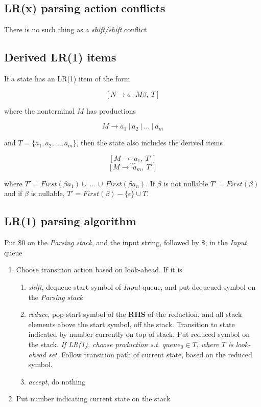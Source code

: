 \documentclass[fontsize=10pt,a4paper]{article}
\begin{document}
\begin{multicols}{3}
    \subsection{LR(x) parsing action conflicts}

    There is no such thing as a \textit{shift/shift} conflict


    \subsection{Derived LR(1) items}

    If a state has an LR(1) item of the form

    \[[N \rightarrow a \cdot M \beta, ~T]\]

    where the nonterminal $M$ has productions

    \[M \rightarrow a_1 ~\vert~ a_2 ~\vert~ \dots ~\vert~ a_m\]

    and $T = \{ a_1, a_2, \dots, a_m \}$, then the state also includes the derived items

    \[[M \rightarrow \cdot a_1, ~T']\]
    \[\dots\]
    \[[M \rightarrow \cdot a_m, ~T']\]

    where $T' = First(\beta a_1) \cup\, \dots\, \cup\, First(\beta a_n)$. If $\beta$ is not nullable $T' = First(\beta)$ and if $\beta$ is nullable, $T' = First(\beta) - \{\epsilon\} \cup T$. 



    \subsection{LR(1) parsing algorithm}

    Put $\$0$ on the \textit{Parsing stack}, and the input string, followed by $\$$, in the \textit{Input} queue

    \begin{enumerate}
        \item Choose transition action based on look-ahead. If it is
        \begin{enumerate}
            \item \textit{shift}, dequeue start symbol of \textit{Input} queue, and put dequeued symbol on the \textit{Parsing stack}
            \item \textit{reduce}, pop start symbol of the \textbf{RHS} of the reduction, and all stack elements above the start symbol, off the stack. Transition to state indicated by number currently on top of stack. Put reduced symbol on the stack. \textit{If LR(1), choose production s.t. $queue_0 \in T$, where $T$ is look-ahead set}. Follow transition path of current state, based on the reduced symbol.
            \item \textit{accept}, do nothing
        \end{enumerate} 
        \item Put number indicating current state on the stack


\end{enumerate}
\end{multicols}
\end{document}
